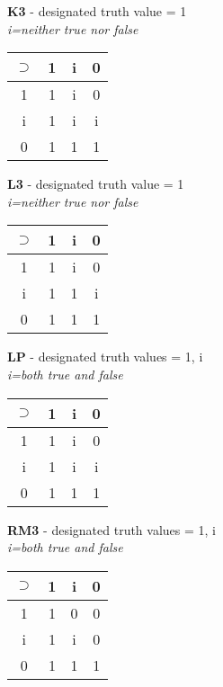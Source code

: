 \documentclass[12pt, fleqn]{article}
\begin{document}
\begin{multicols}{2}
\textbf{K3} - designated truth value = 1\\
\textit{i=neither true nor false}\\
\begin{tabular}{|c|c|c|c|}
\hline
	$\supset$  & 1 & i & 0\\
\hline
	1 & 1 & i & 0\\
\hline
	i & 1 & i & i\\
\hline
	0 & 1 & 1 & 1\\
\hline
\end{tabular}
\vspace{.5cm}

\textbf{L3} - designated truth value = 1\\
\textit{i=neither true nor false}\\
\begin{tabular}{|c|c|c|c|}
\hline
	$\supset$  & 1 & i & 0\\
\hline
	1 & 1 & i & 0\\
\hline
	i & 1 & 1 & i\\
\hline
	0 & 1 & 1 & 1\\
\hline
\end{tabular}
\vspace{.5cm}

\textbf{LP} - designated truth values = 1, i\\
\textit{i=both true and false}\\
\begin{tabular}{|c|c|c|c|}
\hline
	$\supset$  & 1 & i & 0\\
\hline
	1 & 1 & i & 0\\
\hline
	i & 1 & i & i\\
\hline
	0 & 1 & 1 & 1\\
\hline
\end{tabular}
\vspace{.5cm}

\textbf{RM3} - designated truth values = 1, i\\
\textit{i=both true and false}\\
\begin{tabular}{|c|c|c|c|}
\hline
	$\supset$  & 1 & i & 0\\
\hline
	1 & 1 & 0 & 0\\
\hline
	i & 1 & i & 0\\
\hline
	0 & 1 & 1 & 1\\
\hline
\end{tabular}
\end{multicols}
\vspace{.5cm}
\end{document}
